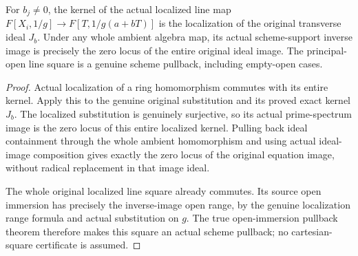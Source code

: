 \begin{theorem}
\label{algebra:localized-line-original-preimage}
\leanok
{}
For $b_j\ne0$, the kernel of the actual localized line map
$F[X_i,1/g]\to F[T,1/g(a+bT)]$ is the localization of the original
transverse ideal $J_b$. Under any whole ambient algebra map, its actual
scheme-support inverse image is precisely the zero locus of the entire
original ideal image. The principal-open line square is a genuine
scheme pullback, including empty-open cases.
\end{theorem}
\begin{proof}
Actual localization of a ring homomorphism commutes with its entire
kernel. Apply this to the genuine original substitution and its proved
exact kernel $J_b$. The localized substitution is genuinely surjective,
so its actual prime-spectrum image is the zero locus of this entire
localized kernel. Pulling back ideal containment through the whole
ambient homomorphism and using actual ideal-image composition gives
exactly the zero locus of the original equation image, without radical
replacement in that image ideal.

The whole original localized line square already commutes. Its source
open immersion has precisely the inverse-image open range, by the
genuine localization range formula and actual substitution on $g$.
The true open-immersion pullback theorem therefore makes this square
an actual scheme pullback; no cartesian-square certificate is assumed.
\end{proof}

